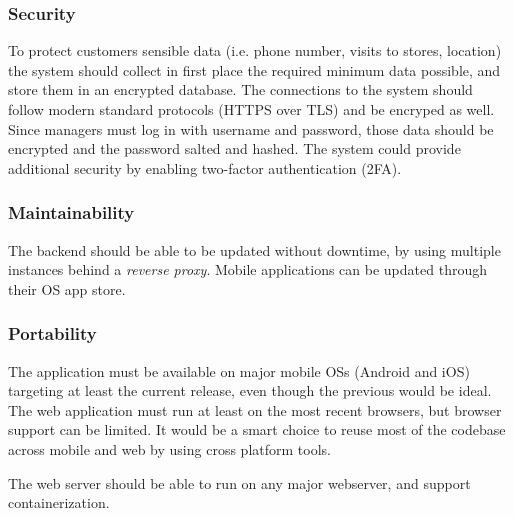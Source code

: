\subsubsection{Security}
To protect customers sensible data (i.e. phone number, visits to stores, location) the system should collect in first place the required minimum data possible, and store them in an encrypted database. The connections to the system should follow modern standard protocols (HTTPS over TLS) and be encryped as well. Since managers must log in with username and password, those data should be encrypted and the password salted and hashed. The system could provide additional security by enabling two-factor authentication  (2FA).

\subsubsection{Maintainability}
The backend should be able to be updated without downtime, by using multiple instances behind a \emph{reverse proxy}.
Mobile applications can be updated through their OS app store.

\subsubsection{Portability}
The application must be available on major mobile OSs (Android and iOS) targeting at least the current release, even though the previous would be ideal.
The web application must run at least on the most recent browsers, but browser support can be limited.
It would be a smart choice to reuse most of the codebase across mobile and web by using cross platform tools.

The web server should be able to run on any major webserver, and support containerization.